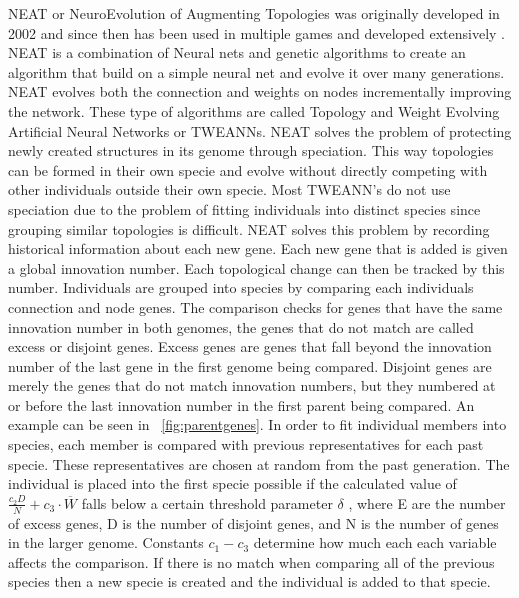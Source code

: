 \documentclass[12pt]{ucthesis} \newif\ifpdf \ifx\pdfoutput\undefined
\begin{document}
NEAT or NeuroEvolution of Augmenting Topologies  was originally developed in
2002 and since then has been used in multiple games and developed extensively
\cite{stanley:phd04}. NEAT is a combination of Neural nets and genetic
algorithms to create an algorithm that build on a simple neural net and evolve it over many
generations. NEAT evolves both the connection and weights on nodes incrementally
improving the network. These type of algorithms are called Topology and Weight
Evolving Artiﬁcial Neural Networks or TWEANNs. NEAT solves the problem of
protecting newly created structures in its genome through speciation. This way
topologies can be formed in their own specie and evolve without directly
competing with other individuals outside their own specie. Most TWEANN’s do not
use speciation due to the problem of fitting individuals into distinct species
since grouping similar topologies is difficult. NEAT solves this problem by
recording historical information about each new gene. Each new gene that is
added is given a global innovation number. Each topological change can then be
tracked by this number. Individuals are grouped into species by comparing each
individuals connection and node genes. The comparison checks for genes that have
the same innovation number in both genomes, the genes that do not match are
called excess or disjoint genes. Excess genes are genes that fall beyond the
innovation number of the last gene in the first genome being compared. Disjoint
genes are merely the genes that do not match innovation numbers, but they
numbered at or before the last innovation number in the first parent being
compared. An example can be seen in  ~\ref{fig:parentgenes}. In order to fit
individual members into species, each member is compared with previous
representatives for each past specie. These representatives are chosen at random
from the past generation. The individual is placed into the first specie
possible if the calculated value of $\frac{c_{2}D}{N} + c_{3} \cdot
\overline{W}$ falls below a certain threshold parameter $\delta$ , where E are
the number of excess genes, D is the number of disjoint genes, and N is the
number of genes in the larger genome. Constants $c_{1} - c_{3}$ determine how
much each each variable affects the comparison. If there is no match when comparing all of the previous species then a new specie is created and the individual is added to that specie.
\end{document}
